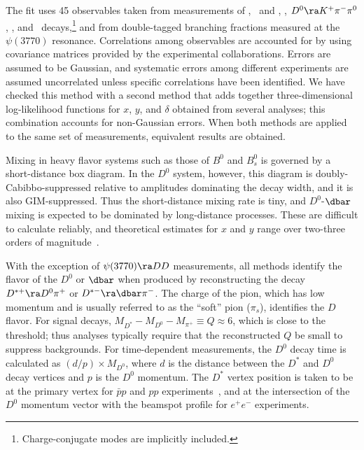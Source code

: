 The fit uses 45 observables taken from 
measurements of \dklnu, \dkk\ and \dpipi, \dkpi, 
$D^0\ra K^+\pi^-\pi^0$, %
\dkspp, and \dkskk\ decays,\footnote{Charge-conjugate modes
are implicitly included.} and from double-tagged branching 
fractions measured at the $\psi(3770)$ resonance. Correlations 
among observables are accounted for by using covariance matrices 
provided by the experimental collaborations. Errors are assumed
to be Gaussian, and systematic errors among different experiments 
are assumed uncorrelated unless specific correlations have been 
identified.
We have checked this method with a second method that adds
together three-dimensional log-likelihood functions 
for $x$, $y$, and $\delta$ obtained from several analyses;
this combination accounts for non-Gaussian errors.
When both methods are applied to the same set of 
measurements, equivalent results are obtained. 


Mixing in heavy flavor systems such as those of $B^0$ and $B^0_s$ 
is governed by a short-distance box diagram. In the $D^0$ system,
however, this diagram is doubly-Cabibbo-suppressed relative to 
amplitudes dominating the decay width, and it is also GIM-suppressed.
Thus the short-distance mixing rate is tiny, and $D^0$-$\dbar$ 
mixing is expected to be dominated by long-distance processes. 
These are difficult to calculate reliably, and theoretical estimates 
for $x$ and $y$ range over two-three orders of 
magnitude~\cite{Bigi:2000wn,Petrov:2003un,Petrov:2004rf,Falk:2004wg}.


With the exception of $\psi(3770)\ra DD$ measurements, all methods 
identify the flavor of the $D^0$ or $\dbar$ when produced by 
reconstructing the decay $D^{*+}\ra D^0\pi^+$ or $D^{*-}\ra\dbar\pi^-$. 
The charge of the pion, which has low momentum and is usually 
referred to as the ``soft'' pion ($\pi^{}_s$),
identifies the $D$ flavor. For signal 
decays, $M^{}_{D^*}-M^{}_{D^0}-M^{}_{\pi^+}\equiv Q\approx 6$\meve, 
which is close to the threshold; thus analyses typically
require that the reconstructed $Q$ be small to suppress backgrounds. 
For time-dependent measurements, the $D^0$ decay time is 
calculated as $(d/p)\times M^{}_{D^0}$, where $d$ is
the distance between the $D^*$ and $D^0$ decay vertices and 
$p$ is the $D^0$ momentum. The $D^*$ vertex position is 
taken to be at the primary vertex for $\bar{p}p$ and $pp$
experiments~\cite{Aaltonen:2007uc,Aaij:2013wda}, and at
the intersection of the $D^0$ momentum vector with the
beamspot profile for $e^+e^-$ experiments.


